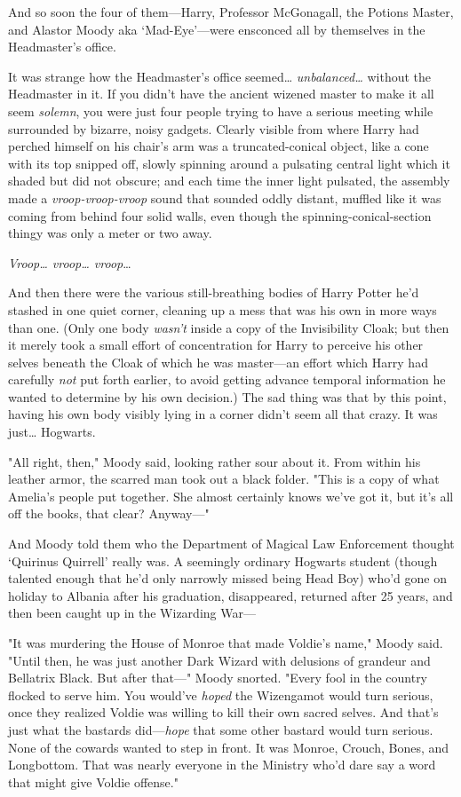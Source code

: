 And so soon the four of them---Harry, Professor McGonagall, the Potions Master,
and Alastor Moody aka `Mad-Eye'---were ensconced all by themselves in the
Headmaster's office.

It was strange how the Headmaster's office seemed{\ldots}
\emph{unbalanced{\ldots}} without the Headmaster in it. If you didn't have the
ancient wizened master to make it all seem \emph{solemn}, you were just four
people trying to have a serious meeting while surrounded by bizarre, noisy
gadgets. Clearly visible from where Harry had perched himself on his chair's
arm was a truncated-conical object, like a cone with its top snipped off,
slowly spinning around a pulsating central light which it shaded but did not
obscure; and each time the inner light pulsated, the assembly made a
\emph{vroop-vroop-vroop} sound that sounded oddly distant, muffled like it was
coming from behind four solid walls, even though the spinning-conical-section
thingy was only a meter or two away.

\emph{Vroop{\ldots} vroop{\ldots} vroop}{\ldots}

And then there were the various still-breathing bodies of Harry Potter he'd
stashed in one quiet corner, cleaning up a mess that was his own in more ways
than one. (Only one body \emph{wasn't} inside a copy of the Invisibility Cloak;
but then it merely took a small effort of concentration for Harry to perceive
his other selves beneath the Cloak of which he was master---an effort which
Harry had carefully \emph{not} put forth earlier, to avoid getting advance
temporal information he wanted to determine by his own decision.) The sad thing
was that by this point, having his own body visibly lying in a corner didn't
seem all that crazy. It was just{\ldots} Hogwarts.

"All right, then," Moody said, looking rather sour about it. From within his
leather armor, the scarred man took out a black folder. "This is a copy of what
Amelia's people put together. She almost certainly knows we've got it, but it's
all off the books, that clear? Anyway---"

And Moody told them who the Department of Magical Law Enforcement thought
`Quirinus Quirrell' really was. A seemingly ordinary Hogwarts student (though
talented enough that he'd only narrowly missed being Head Boy) who'd gone
on holiday to Albania after his graduation, disappeared,
returned after 25 years, and then been caught up in the Wizarding War---

"It was murdering the House of Monroe that made Voldie's name," Moody said.
"Until then, he was just another Dark Wizard with delusions of grandeur and
Bellatrix Black. But after that---" Moody snorted. "Every fool in the country
flocked to serve him. You would've \emph{hoped} the Wizengamot would turn
serious, once they realized Voldie was willing to kill their own sacred selves.
And that's just what the bastards did---\emph{hope} that some other bastard
would turn serious. None of the cowards wanted to step in front. It was Monroe,
Crouch, Bones, and Longbottom. That was nearly everyone in the Ministry who'd
dare say a word that might give Voldie offense."

